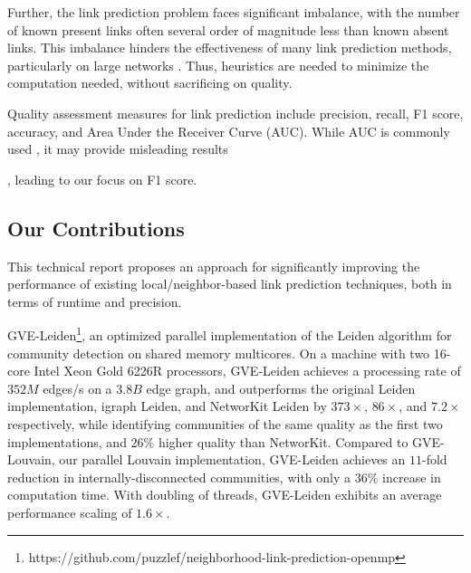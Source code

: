 Further, the link prediction problem faces significant imbalance, with the number of known present links often several order of magnitude less than known absent links. This imbalance hinders the effectiveness of many link prediction methods, particularly on large networks \cite{wang2014link, garcia2014link}. Thus, heuristics are needed to minimize the computation needed, without sacrificing on quality. Quality assessment measures for link prediction include precision, recall, F1 score, accuracy, and Area Under the Receiver Curve (AUC). While AUC is commonly used \cite{arrar2023comprehensive}, it may provide misleading results \cite{yang2015evaluating, lichtnwalter2012link}, leading to our focus on F1 score.





\subsection{Our Contributions}

This technical report proposes an approach for significantly improving the performance of existing local/neighbor-based link prediction techniques, both in terms of runtime and precision.

GVE-Leiden\footnote{https://github.com/puzzlef/neighborhood-link-prediction-openmp}, an optimized parallel implementation of the Leiden algorithm for community detection on shared memory multicores. On a machine with two 16-core Intel Xeon Gold 6226R processors, GVE-Leiden achieves a processing rate of $352 M$ edges/s on a $3.8 B$ edge graph, and outperforms the original Leiden implementation, igraph Leiden, and NetworKit Leiden by $373\times$, $86\times$, and $7.2\times$ respectively, while identifying communities of the same quality as the first two implementations, and $26\%$ higher quality than NetworKit. Compared to GVE-Louvain, our parallel Louvain implementation, GVE-Leiden achieves an $11$-fold reduction in internally-disconnected communities, with only a $36\%$ increase in computation time. With doubling of threads, GVE-Leiden exhibits an average performance scaling of $1.6\times$.

